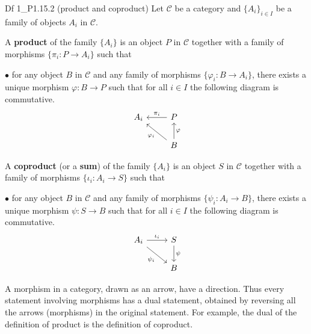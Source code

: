 \documentclass{article}
\begin{document}
\begin{Df}{Df 1\_P1.15.2 (product and coproduct)}
    Let $\mathscr{C}$ be a category and $\{A_i\}_{i\in I}$ be a family of objects $A_i$ in $\mathscr{C}$. 
    \begin{compactenum}
        \item A \textbf{product} of the family $\{A_i\}$ is an object $P$ in $\mathscr{C}$ together with a family of morphisms $\{\pi_i: P\to A_i\}$ such that
        \begin{compactitem}
            \item[$\bullet$] for any object $B$ in $\mathscr{C}$ and any family of morphisms $\{\varphi_i: B\to A_i\}$, there exists a unique morphism $\varphi: B \to P$ such that for all $i\in I$ the following diagram is commutative. 
            $$ \begin{tikzcd}
                A_i & \arrow[l, "\pi_i"'] P \\
                & B \arrow[lu, "\varphi_i"] \arrow[u, "\varphi"']
            \end{tikzcd} $$
        \end{compactitem}
        \item A \textbf{coproduct} (or a \textbf{sum}) of the family $\{A_i\}$ is an object $S$ in $\mathscr{C}$ together with a family of morphisms $\{\iota_i: A_i\to S\}$ such that
        \begin{compactitem}
            \item[$\bullet$] for any object $B$ in $\mathscr{C}$ and any family of morphisms $\{\psi_i: A_i\to B\}$, there exists a unique morphism $\psi: S \to B$ such that for all $i\in I$ the following diagram is commutative.
            $$ \begin{tikzcd}
                A_i \arrow[r, "\iota_i"] \arrow[rd, "\psi_i"'] & S \arrow[d, "\psi"] \\
                & B
            \end{tikzcd} $$
        \end{compactitem}
    \end{compactenum}
\end{Df}

\begin{Rmk}{}
    A morphism in a category, drawn as an arrow, have a direction. Thus every statement involving morphisms has a dual statement, obtained by reversing all the arrows (morphisms) in the original statement. For example, the dual of the definition of product is the definition of coproduct.
\end{Rmk}
\end{document}
